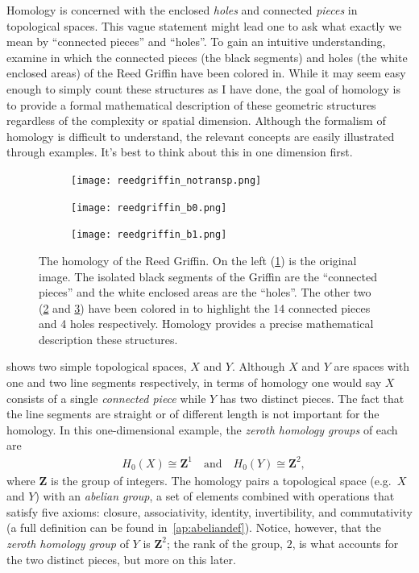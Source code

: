 Homology is concerned with the enclosed \textit{holes} and connected \textit{pieces} in topological spaces. This vague statement might lead one to ask what exactly we mean by ``connected pieces'' and ``holes''. To gain an intuitive understanding, examine  in which the connected pieces (the black segments) and holes (the white enclosed areas) of the Reed Griffin have been colored in. While it may seem easy enough to simply count these structures as I have done, the goal of homology is to provide a formal mathematical description of these geometric structures regardless of the complexity or spatial dimension. Although the formalism of homology is difficult to understand, the relevant concepts are easily illustrated through examples. It's best to think about this in one dimension first.
%
\begin{figure}[h]
	\centering
	\begin{subfigure}[b]{0.3\textwidth}
		\texttt{[image: reedgriffin\_notransp.png]}
		\caption{} \label{fig:reedgriffin_orig}
	\end{subfigure} \quad
	\begin{subfigure}[b]{0.3\textwidth}
		\texttt{[image: reedgriffin\_b0.png]}
		\caption{} \label{fig:reedgriffin_b0}
	\end{subfigure} \quad
	\begin{subfigure}[b]{0.3\textwidth}
		\texttt{[image: reedgriffin\_b1.png]}
		\caption{} \label{fig:reedgriffin_b1}
	\end{subfigure}
	\caption{The homology of the Reed Griffin. On the left (\ref{fig:reedgriffin_orig}) is the original image. The isolated black segments of the Griffin are the ``connected pieces'' and the white enclosed areas are the ``holes''. The other two (\ref{fig:reedgriffin_b0} and \ref{fig:reedgriffin_b1}) have been colored in to highlight the 14 connected pieces and 4 holes respectively. Homology provides a precise mathematical description these structures.} \label{fig:reedgriffin}
\end{figure}
%

 shows two simple topological spaces, $X$ and $Y$. Although $X$ and $Y$ are spaces with one and two line segments respectively, in terms of homology one would say $X$ consists of a single \textit{connected piece} while $Y$ has two distinct pieces. The fact that the line segments are straight or of different length is not important for the homology. In this one-dimensional example, the \textit{zeroth homology groups} of each are
%
\begin{align}
	& H_0(X) \cong \mathbf{Z}^1 \quad \text{and} \quad H_0(Y) \cong \mathbf{Z}^2,
	\label{eq:homology1d}
\end{align}
%
where $\mathbf{Z}$ is the group of integers. The homology pairs a topological space (e.g.\ $X$ and $Y$) with an \textit{abelian group}, a set of elements combined with operations that satisfy five axioms: closure, associativity, identity, invertibility, and commutativity (a full definition can be found in~\ref{ap:abeliandef}). Notice, however, that the \textit{zeroth homology group} of $Y$ is $\mathbf{Z}^2$; the rank of the group, $2$, is what accounts for the two distinct pieces, but more on this later.

